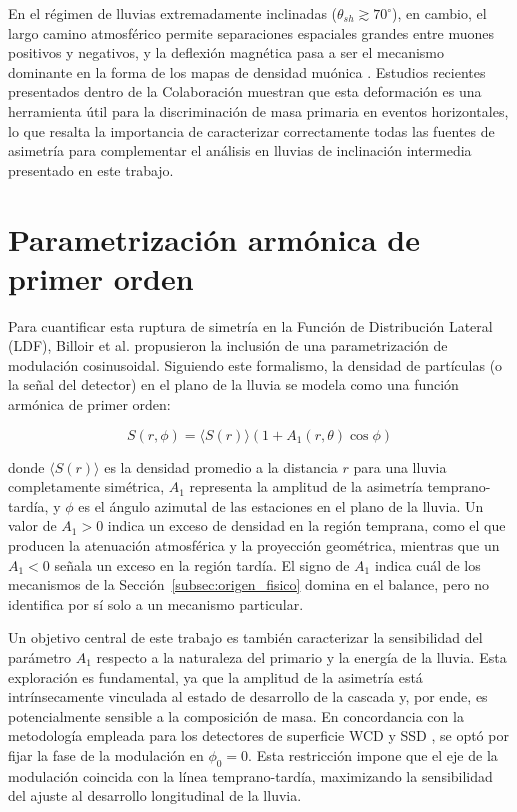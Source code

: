 En el régimen de lluvias extremadamente inclinadas ($\theta_{sh} \gtrsim 70^\circ$), en cambio, el largo camino atmosférico permite separaciones espaciales grandes entre muones positivos y negativos, y la deflexión magnética pasa a ser el mecanismo dominante en la forma de los mapas de densidad muónica \cite{GAP2007_124, collaboration_2014}. Estudios recientes presentados dentro de la Colaboración \cite{Scornavacche2026} muestran que esta deformación es una herramienta útil para la discriminación de masa primaria en eventos horizontales, lo que resalta la importancia de caracterizar correctamente todas las fuentes de asimetría para complementar el análisis en lluvias de inclinación intermedia presentado en este trabajo.

\section{Parametrización armónica de primer orden}
\label{subsec:parametrizacion}

Para cuantificar esta ruptura de simetría en la Función de Distribución Lateral (LDF), Billoir et al. \cite{Billoir2002} propusieron la inclusión de una parametrización de modulación cosinusoidal. Siguiendo este formalismo, la densidad de partículas (o la señal del detector) en el plano de la lluvia se modela como una función armónica de primer orden:

\begin{equation}
	S(r,\phi) = \langle S(r) \rangle \left( 1 + A_1(r, \theta) \cos\phi \right)
	\label{eq:asimetria_a1}
\end{equation}

donde $\langle S(r) \rangle$ es la densidad promedio a la distancia $r$ para una lluvia completamente simétrica, $A_1$ representa la amplitud de la asimetría temprano-tardía, y $\phi$ es el ángulo azimutal de las estaciones en el plano de la lluvia. Un valor de $A_1 > 0$ indica un exceso de densidad en la región temprana, como el que producen la atenuación atmosférica y la proyección geométrica, mientras que un $A_1 < 0$ señala un exceso en la región tardía. El signo de $A_1$ indica cuál de los mecanismos de la Sección~\ref{subsec:origen_fisico} domina en el balance, pero no identifica por sí solo a un mecanismo particular.

Un objetivo central de este trabajo es también caracterizar la sensibilidad del parámetro $A_1$ respecto a la naturaleza del primario y la energía de la lluvia. Esta exploración es fundamental, ya que la amplitud de la asimetría está intrínsecamente vinculada al estado de desarrollo de la cascada y, por ende, es potencialmente sensible a la composición de masa. En concordancia con la metodología empleada para los detectores de superficie WCD y SSD \cite{BradfieldThesis}, se optó por fijar la fase de la modulación en $\phi_0 = 0$. Esta restricción impone que el eje de la modulación coincida con la línea temprano-tardía, maximizando la sensibilidad del ajuste al desarrollo longitudinal de la lluvia.


